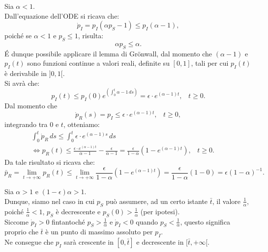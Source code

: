 \documentclass[11pt,largemargins]{homework}
\begin{document}
\begin {alphaparts}
  
  \newpage
 \questionpart
 Sia $\alpha < 1$.\\
 Dall'equazione dell'ODE si ricava che:
 \begin{equation*}
 \dot{p}_{I}=p_{I}\left(\alpha p_{S}-1\right)\leq p_{I}\left(\alpha-1\right),
\end{equation*}  
poiché se $\alpha<1$ e $p_{S}\leq 1$, risulta:
\begin{equation*}
\alpha p_{S}\leq \alpha.
\end{equation*}
\'E dunque possibile applicare il lemma di Gr\"onwall, dal momento che $\left(\alpha-1\right)$ e $p_{I}\left(t\right)$ sono funzioni continue a valori reali, definite su $[0,1]$, tali per cui $p_{I}\left(t\right)$ è derivabile in $]0,1[$.\\
Si avrà che:
\begin{equation*}
p_{I}\left(t\right)\leq p_{I}\left(0\right)e^{\left(\int_{0}^{t} \alpha-1 \,ds\right)}=\epsilon\cdot e^{\left(\alpha - 1\right)t}, \,\,\,\,\, t\geq 0.
\end{equation*}
Dal momento che
\begin{equation*}
\dot{p}_{R}\left(s\right)=p_{I}\leq \epsilon\cdot e^{\left(\alpha - 1\right)t}, \,\,\,\,\, t\geq 0,
\end{equation*}
integrando tra $0$ e $t$, otteniamo:
\begin{align*}
\int_{0}^{t} \dot{p}_{R} \,ds \leq \int_{0}^{t} \epsilon\cdot e^{\left(\alpha - 1\right)s} \,ds && \\
\Leftrightarrow p_{R}\left(t\right)\leq \frac{\epsilon\cdot e^{\left(\alpha - 1\right)t}}{\alpha-1} - \frac{\epsilon}{\alpha-1}= \frac{\epsilon}{1-\alpha}\left(1-e^{\left(\alpha-1\right)t}\right), \,\,\,\,\, t\geq 0.
\end{align*}
Da tale risultato si ricava che:
\begin{equation*}
\bar{p}_{R}=\lim\limits_{t \rightarrow +\infty}p_{R}\left(t\right)\leq \lim\limits_{t \rightarrow +\infty}\frac{\epsilon}{1-\alpha}\left(1-e^{\left(\alpha-1\right)t}\right)=\frac{\epsilon}{1-\alpha}\left(1-0\right)=\epsilon\left(1-\alpha\right)^{-1}.
\end{equation*}

\questionpart
Sia $\alpha>1$ e $\left(1-\epsilon\right)\alpha>1$.\\
Dunque, siamo nel caso in cui $p_{S}$ può assumere, ad un certo istante $\bar{t}$, il valore $\frac{1}{\alpha}$, poiché $\frac{1}{\alpha}<1$, $p_{S}$ è decrescente e $p_{S}\left(0\right)>\frac{1}{\alpha}$ (per ipotesi).\\
Siccome $\dot{p}_{I}>0$ fintantoché $p_{S} >\frac{1}{\alpha}$ e $\dot{p}_{I}<0$ quando $p_{S}<\frac{1}{\alpha}$, questo significa proprio che $\bar{t}$ è un punto di massimo assoluto per $p_{I}$.\\
Ne consegue che $p_{I}$ sarà crescente in $[0,\bar{t}]$ e decrescente in $[\bar{t},+\infty[$.


\end{alphaparts}
\end{document}
